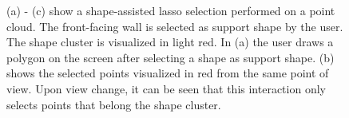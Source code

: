 \begin{figure}
    \centering
    \par\medskip
    \par\medskip        
    \caption[Screenshots of the workflow of a shape-assisted lasso selection. (a) shows the lasso and the support shape, (b) the selected points, (c) shows that only points are selected on the support shape.]
    {(a) - (c) show a shape-assisted lasso selection performed on a point cloud. The front-facing wall is selected as support shape by the user. The shape cluster is visualized in light red. In (a) the user draws a polygon on the screen after selecting a shape as support shape. (b) shows the selected points visualized in red from the same point of view. Upon view change, it can be seen that this interaction only selects points that belong the shape cluster. }
    \label{fig:lasso_assisted}
\end{figure}


